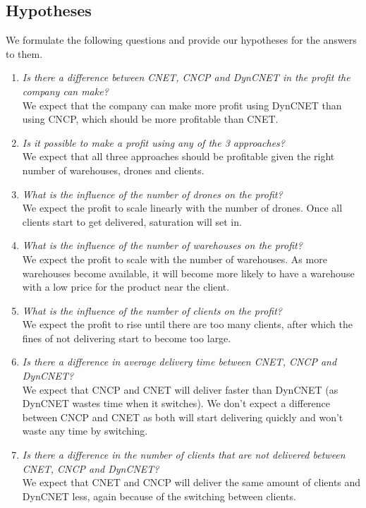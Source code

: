 \documentclass[10pt,a4paper,twocolumn]{article}
\begin{document}
\subsection{Hypotheses}
We formulate the following questions and provide our hypotheses for the answers to them.
\begin{enumerate}
\item \textit{Is there a difference between CNET, CNCP and DynCNET in the profit the company can make?} \\
We expect that the company can make more profit using DynCNET than using CNCP, which should be more profitable than CNET.


\item\textit{Is it possible to make a profit using any of the 3 approaches?}\\
We expect that all three approaches should be profitable given the right number of warehouses, drones and clients.

\item\textit{What is the influence of the number of drones on the profit?}\\
We expect the profit to scale linearly with the number of drones. Once all clients start to get delivered, saturation will set in.

\item\textit{What is the influence of the number of warehouses on the profit?}\\
We expect the profit to scale with the number of warehouses. As more warehouses become available, it will become more likely to have a warehouse with a low price for the product near the client.

\item\textit{What is the influence of the number of clients on the profit?}\\
We expect the profit to rise until there are too many clients, after which the fines of not delivering start to become too large.

\item\textit{Is there a difference in average delivery time between CNET, CNCP and DynCNET?} \\
We expect that CNCP and CNET will deliver faster than DynCNET (as DynCNET wastes time when it switches). We don't expect a difference between CNCP and CNET as both will start delivering quickly and won't waste any time by switching.

\item\textit{Is there a difference in the number of clients that are not delivered between CNET, CNCP and DynCNET?} \\
We expect that CNET and CNCP will deliver the same amount of clients and DynCNET less, again because of the switching between clients.


\end{enumerate}
\end{document}
